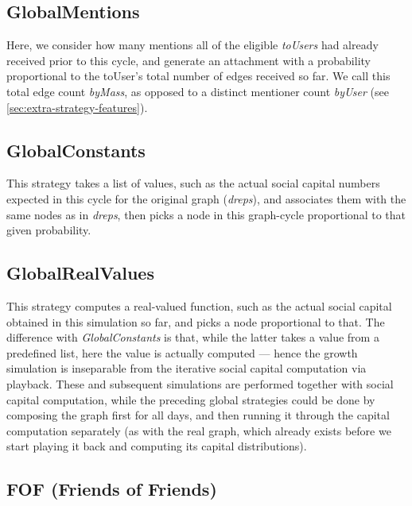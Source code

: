 \documentclass[10pt,oneside]{memoir}
\begin{document}
\subsection{GlobalMentions}
\label{globalmentions}

Here, we consider how many mentions all of the eligible {\itshape toUsers} had already received prior to this cycle, and generate an attachment with a probability proportional to the toUser's total number of edges received so far. We call this total edge count {\itshape byMass}, as opposed to a distinct mentioner count {\itshape byUser} (see \ref {sec:extra-strategy-features}).


\subsection{GlobalConstants}
\label{globalconstants}

This strategy takes a list of values, such as the actual social capital numbers expected in this cycle for the original graph ({\itshape dreps}), and associates them with the same nodes as in {\itshape dreps}, then picks a node in this graph-cycle proportional to that given probability.


\subsection{GlobalRealValues}
\label{globalrealvalues}

This strategy computes a real-valued function, such as the actual social capital obtained in this simulation so far, and picks a node proportional to that.  The difference with {\itshape GlobalConstants} is that, while the latter takes a value from a predefined list, here the value is actually computed --- hence the growth simulation is inseparable from the iterative social capital computation via playback.  These and subsequent simulations are performed together with social capital computation, while the preceding global strategies could be done by composing the graph first for all days, and then running it through the capital computation separately (as with the real graph, which already exists before we start playing it back and computing its capital distributions).


\subsection{FOF (Friends of Friends)}
\label{foffriendsoffriends}
\end{document}
